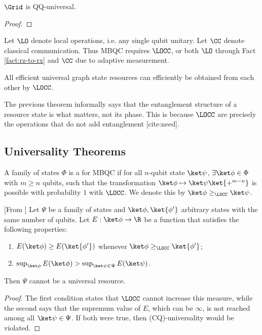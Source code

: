 \begin{theorem}
$\Grid$ is QQ-universal.
\begin{proof}
\end{proof}
\end{theorem}

\begin{definition}
Let $\LO$ denote local operations, i.e. any single qubit unitary. Let $\CC$ denote classical communication. Thus MBQC requires $\LOCC$, or both $\LO$ through Fact \ref{fact:rz-to-rx} and $\CC$ due to adaptive measurement.
\end{definition}

\begin{theorem} All efficient universal graph state resources can efficiently be obtained from each other by $\LOCC$.
\end{theorem}

\begin{remark}
The previous theorem informally says that the entanglement structure of a resource state is what matters, not its phase. This is because $\LOCC$ are precisely the operations that do not add entanglement [cite:need].
\end{remark}

\subsection{Universality Theorems}

\begin{definition}
A family of states $\Phi$ is a  for MBQC if for all $n$-qubit state $\ket\psi$, $\exists \ket\phi \in \Phi$ with $m \geq n$ qubits, such that the transformation $\ket\phi \mapsto \ket\psi \ket{+^{m-n}}$ is possible with probability $1$ with $\LOCC$. We denote this by $\ket\phi \geq_{\LOCC} \ket\psi$. 
\end{definition}

\begin{theorem}
\label{thm:measure-for-universal}
[From \cite{MBQC-measures}] Let $\Psi$ be a family of states and $\ket\phi, \ket{\phi'}$ arbitrary states with the same number of qubits. Let $E: \ket\phi \to \R$ be a function that satisfies the following properties:
\begin{enumerate}
    \item $E(\ket\phi) \geq E(\ket{\phi'})$ whenever $\ket\phi \geq_\LOCC \ket{\phi'}$;
    \item $\sup_{\ket\phi} E(\ket\phi) > \sup_{\ket\psi \in \Psi} E(\ket\psi)$. 
\end{enumerate}
Then $\Psi$ cannot be a universal resource.
\begin{proof}
The first condition states that $\LOCC$ cannot increase this measure, while the second says that the supremum value of $E$, which can be $\infty$, is not reached among all $\ket\psi \in \Psi$. If both were true, then (CQ)-universality would be violated.
\end{proof}
\end{theorem}

